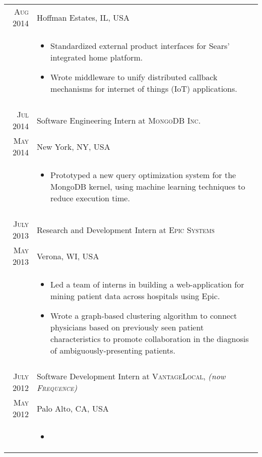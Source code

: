 \documentclass[a4paper,10pt]{article}
\begin{document}
\begin{longtable}{r|p{11cm}}
 \nopagebreak \textsc{Aug 2014} & \small{Hoffman Estates, IL, USA}\\
 \nopagebreak & \footnotesize{
	\begin{itemize}
		\item[]{
			Standardized external product interfaces for Sears’ integrated home platform.
		}
		\item[]{
			Wrote middleware to unify distributed callback mechanisms for internet of things (IoT) applications.
		}
	\end{itemize}
   }\\
 \multicolumn{2}{c}{} \\
 \nopagebreak \textsc{Jul 2014} & Software Engineering Intern at \textsc{MongoDB Inc.}\\
 \nopagebreak \textsc{May 2014} & \small{New York, NY, USA} \\
 \nopagebreak	& \footnotesize{
	\begin{itemize}
		\item[]{
			Prototyped a new query optimization system for the MongoDB kernel, using
machine learning techniques to reduce execution time.
		}
	\end{itemize}
   }\\
 \multicolumn{2}{c}{} \\
 \nopagebreak \textsc{July 2013} & Research and Development Intern at \textsc{Epic Systems}\\
 \nopagebreak \textsc{May 2013} & \small{Verona, WI, USA} \\
 \nopagebreak	& \footnotesize{
	\begin{itemize}
		\item[]{
			Led a team of interns in building a web-application for mining patient data across
			hospitals using Epic.
		}
		\item[]{
			Wrote a graph-based clustering algorithm to connect physicians based on
previously seen patient characteristics to promote collaboration in the diagnosis
of ambiguously-presenting patients.
		}
	\end{itemize}
   }\\
 \multicolumn{2}{c}{} \\
 \nopagebreak \textsc{July 2012} & Software Development Intern at \textsc{VantageLocal}, \small\emph{(now \textsc{Frequence})}\\
 \nopagebreak \textsc{May 2012} & \small{Palo Alto, CA, USA}\\
 \nopagebreak & \footnotesize{
	\begin{itemize}
		\item[]{
}
\end{itemize}}
\end{longtable}
\end{document}
